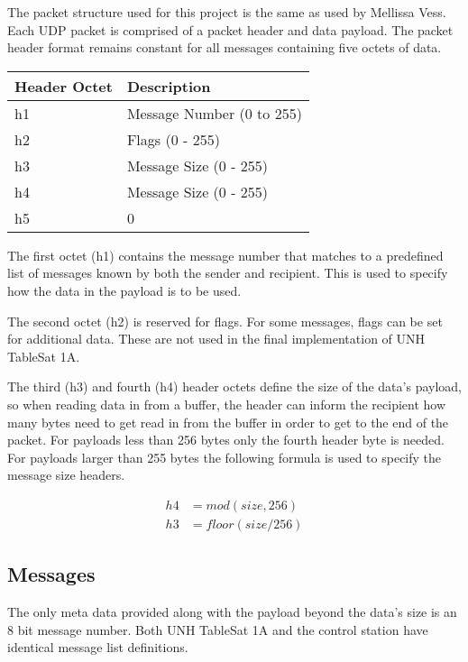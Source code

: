 The packet structure used for this project is the same as used by Mellissa Vess.
Each UDP packet is comprised of a packet header and data payload.  The packet
header format remains constant for all messages containing five octets of data.

\begin{center}
    \begin{tabular}{| l | l |}
    \hline
    Header Octet & Description \\ \hline
    h1 & Message Number (0 to 255) \\ \hline
    h2 & Flags (0 - 255) \\ \hline
    h3 & Message Size (0 - 255) \\ \hline
    h4 & Message Size (0 - 255) \\ \hline
    h5 & 0 \\ \hline
    \end{tabular}
\end{center}

The first octet (h1) contains the message number that matches to a predefined list
of messages known by both the sender and recipient.  This is used to specify
how the data in the payload is to be used.

The second octet (h2) is reserved for flags.  For some messages, flags can be
set for additional data.  These are not used in the final implementation of
UNH TableSat 1A.

The third (h3) and fourth (h4) header octets define the size of the data's payload, so when reading
data in from a buffer, the header can inform the recipient how many bytes need
to get read in from the buffer in order to get to the end of the packet.  For
payloads less than 256 bytes only the fourth header byte is needed.  For
payloads larger than 255 bytes the following formula is used to specify the
message size headers.

\begin{align}
h4 &= mod(size, 256) \\
h3 &= floor(size / 256)
\end{align}


\subsection{Messages}

The only meta data provided along with the payload beyond the data's size is
an 8 bit message number.  Both UNH TableSat 1A and the control station have
identical message list definitions.

